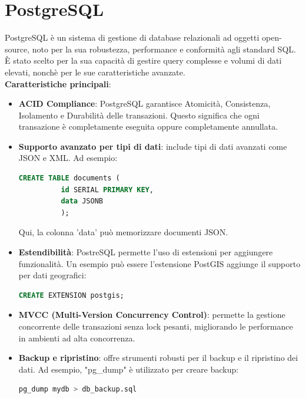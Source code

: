 \documentclass[a4paper, 12pt]{book}
\begin{document}
\section{PostgreSQL}

PostgreSQL \cite{PostgreSQL} è un sistema di gestione di database relazionali ad oggetti open-source, noto per la sua robustezza, performance e conformità agli standard SQL. È stato
scelto per la sua capacità di gestire query complesse e volumi di dati elevati, nonchè per le sue caratteristiche avanzate.\\

\textbf{Caratteristiche principali}:

\begin{itemize}
  \item \textbf{ACID Compliance}: PostgreSQL garantisce Atomicità, Consistenza, Isolamento e Durabilità delle transazioni.
        Questo significa che ogni transazione è completamente eseguita oppure completamente annullata.
  \item \textbf{Supporto avanzato per tipi di dati}: include tipi di dati avanzati come JSON e XML. Ad esempio:\\
        \begin{lstlisting}[language=sql]
          CREATE TABLE documents (
          id SERIAL PRIMARY KEY,
          data JSONB
          );
        \end{lstlisting}
        Qui, la colonna 'data' può memorizzare documenti JSON.
  \item \textbf{Estendibilità}: PostreSQL permette l'uso di estensioni per aggiungere funzionalità. Un esempio può essere l'estensione
        PostGIS aggiunge il supporto per dati geografici:\\
        \begin{lstlisting}[language=sql]
          CREATE EXTENSION postgis;
        \end{lstlisting}
  \item \textbf{MVCC (Multi-Version Concurrency Control)}: permette la gestione concorrente delle transazioni senza lock pesanti, migliorando le
        performance in ambienti ad alta concorrenza.\\
  \item \textbf{Backup e ripristino}: offre strumenti robusti per il backup e il ripristino dei dati. Ad esempio, "pg\_dump" è
        utilizzato per creare backup:\\
        \begin{lstlisting}[language=sql]
          pg_dump mydb > db_backup.sql
        \end{lstlisting}
\end{itemize}
\end{document}
